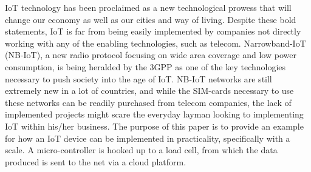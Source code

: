 IoT technology has been proclaimed as a new technological prowess that will change our economy as well as our cities and way of living. Despite these bold statements, IoT is far from being easily implemented by companies not directly working with any of the enabling technologies, such as telecom. Narrowband-IoT (NB-IoT), a new radio protocol focusing on wide area coverage and low power consumption, is being heralded by the 3GPP as one of the key technologies necessary to push society into the age of IoT. NB-IoT networks are still extremely new in a lot of countries, and while the SIM-cards necessary to use these networks can be readily purchased from telecom companies, the lack of implemented projects might scare the everyday layman looking to implementing IoT within his/her business. The purpose of this paper is to provide an example for how an IoT device can be implemented in practicality, specifically with a scale. A micro-controller is hooked up to a load cell, from which the data produced is sent to the net via a cloud platform. 